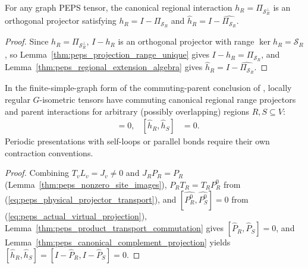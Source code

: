 \begin{lemma}%
    \label{thm:peps_canonical_complement_projection}
    \leanok
    For any graph PEPS tensor, the canonical regional interaction
    $h_R=\Pi_{\mathcal S_R^\perp}$ is an orthogonal projector satisfying
    $h_R=I-\Pi_{\mathcal S_R}$ and $\widehat h_R=I-\widehat{\Pi_{\mathcal S_R}}$.
\end{lemma}
\begin{proof}\leanok
    Since $h_R=\Pi_{\mathcal S_R^\perp}$, $I-h_R$ is an orthogonal projector
    with range $\ker h_R=\mathcal S_R$, so
    Lemma~\ref{thm:peps_projection_range_unique} gives $I-h_R=\Pi_{\mathcal S_R}$,
    and Lemma~\ref{thm:peps_regional_extension_algebra} gives
    $\widehat h_R=I-\widehat{\Pi_{\mathcal S_R}}$.
\end{proof}

\begin{lemma}%
    \label{thm:peps_isometric_regional_parents_commute}
    \leanok
    In the finite-simple-graph form of the commuting-parent conclusion
    of \cite[Theorem~6.12]{Schuch2010PEPS}, locally regular $G$-isometric tensors have
    commuting canonical regional range projectors and parent interactions
    for arbitrary (possibly overlapping) regions $R,S\subseteq V$:
    \begin{align}
        [\widehat P_R,\widehat P_S] & =0, &
        [\widehat h_R,\widehat h_S] & =0.
        \label{eq:peps_physical_parent_commutation}
    \end{align}
    Periodic presentations with self-loops or parallel bonds require their
    own contraction conventions.
\end{lemma}
\begin{proof}\leanok
    Combining $T_vL_v=J_v\ne0$ and $J_RP_R=P_R$
    (Lemma~\ref{thm:peps_nonzero_site_images}), $P_RT_R=T_RP_R^0$ from
    (\ref{eq:peps_physical_projector_transport}), and
    $[\widehat{P_R^0},\widehat{P_S^0}]=0$ from
    (\ref{eq:peps_actual_virtual_projection}),
    Lemma~\ref{thm:peps_product_transport_commutation} gives
    $[\widehat P_R,\widehat P_S]=0$, and Lemma~\ref{thm:peps_canonical_complement_projection}
    yields $[\widehat h_R,\widehat h_S]=[I-\widehat P_R,I-\widehat P_S]=0$.
\end{proof}
